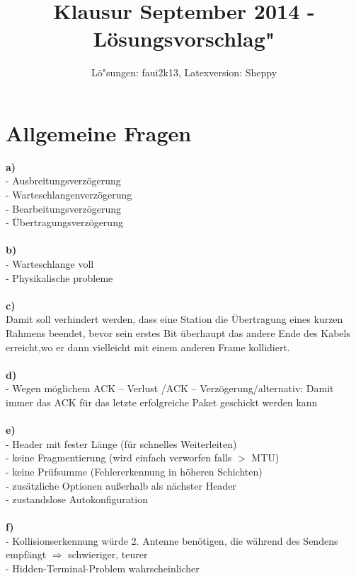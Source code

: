 \documentclass{article}
\title{Klausur September 2014 - L\"osungsvorschlag"}
\author{L\"o"sungen: faui2k13, Latexversion: Sheppy}
\begin{document}
	\maketitle
	\section{Allgemeine Fragen}
			\textbf{a)}\\
				- Ausbreitungsverz\"ogerung\\
				- Warteschlangenverz\"ogerung\\
				- Bearbeitungsverz\"ogerung\\
				- \"Ubertragungsverz\"ogerung\\\\
			\textbf{b)}\\
				- Warteschlange voll\\
				- Physikalische probleme\\\\
			\textbf{c)}\\
				Damit soll verhindert werden, dass eine Station die \"Ubertragung eines kurzen Rahmens 
				beendet, bevor sein erstes Bit \"uberhaupt das andere Ende des Kabels erreicht,wo er dann 
				vielleicht mit einem anderen Frame kollidiert. \\\\
			\textbf{d)}\\
				- Wegen m\"oglichem ACK – Verlust /ACK – Verz\"ogerung/alternativ: Damit immer das ACK für 
				das letzte erfolgreiche Paket geschickt werden kann\\\\
			\textbf{e)}\\
				- Header mit fester L\"ange (für schnelles Weiterleiten)\\
				- keine Fragmentierung (wird einfach verworfen falls $>$ MTU)\\
				- keine Pr\"ufsumme (Fehlererkennung in h\"oheren Schichten)\\
				- zusätzliche Optionen außerhalb als nächster Header\\
				- zustandslose Autokonfiguration\\\\
			\textbf{f)}\\
				- Kollisionserkennung würde 2. Antenne ben\"otigen, die während des Sendens empf\"angt 
				\noindent\;\;\;$\Rightarrow$ schwieriger, teurer \\
				-  Hidden-Terminal-Problem wahrscheinlicher\\\\
\end{document}
